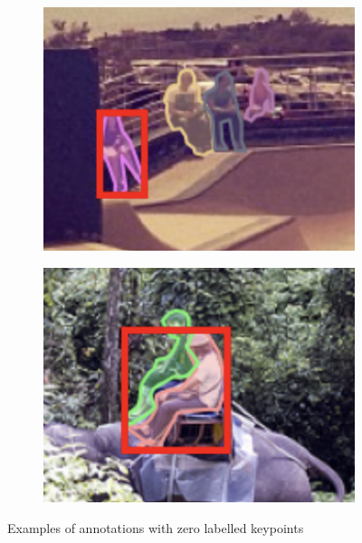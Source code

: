 \documentclass[11pt, letterpaper]{article}
\begin{document}
\begin{figure}[h]
    \centering
    \begin{subfigure}{0.4\textwidth}
        \includegraphics[width=\linewidth]{zero_kp_skatepark.png}
    \end{subfigure}
    \begin{subfigure}{0.4\textwidth}
        \includegraphics[width=\linewidth]{zero_kp_elephant.png}
    \end{subfigure}
    \caption{Examples of annotations with zero labelled keypoints}
    \label{fig:zero_kp_images}
\end{figure}
\end{document}
